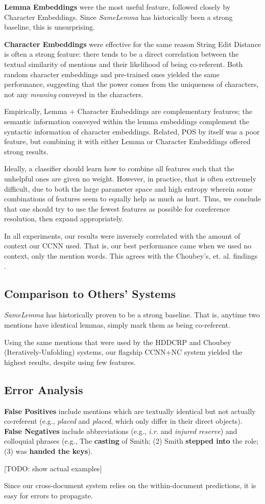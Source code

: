 \textbf{Lemma Embeddings} were the most useful feature, followed closely by Character Embeddings.  Since \textit{SameLemma} has historically been a strong baseline, this is unsurprising.  

\textbf{Character Embeddings} were effective for the same reason String Edit Distance is often a strong feature: there tends to be a direct correlation between the textual similarity of mentions and their likelihood of being co-referent. Both random character embeddings and pre-trained ones yielded the same performance, suggesting that the power comes from the uniqueness of characters, not any \textit{meaning} conveyed in the characters.

Empirically, Lemma + Character Embeddings are complementary features; the semantic information conveyed within the lemma embeddings complement the syntactic information of character embeddings.  Related, POS by itself was a poor feature, but combining it with either Lemma or Character Embeddings offered strong results. 

Ideally, a classifier should learn how to combine all features such that the unhelpful ones are given no weight.  However, in practice, that is often extremely difficult, due to both the large parameter space and high entropy wherein some combinations of features seem to equally help as much as hurt.  Thus, we conclude that one should try to use the fewest features as possible for coreference resolution, then expand appropriately.

In all experiments, our results were inversely correlated with the amount of context our CCNN used.  That is, our best performance came when we used no context, only the mention words.  This agrees with the Choubey's, et. al. findings \cite{Choubey2017EventCR}.

\subsection{Comparison to Others' Systems}
\textit{SameLemma} has historically proven to be a strong baseline.  That is, anytime two mentions have identical lemmas, simply mark them as being co-referent.

Using the same mentions that were used by the HDDCRP and Choubey (Iteratively-Unfolding) systems, our flagship CCNN+NC system yielded the highest results, despite using few features.


\subsection{Error Analysis}
\textbf{False Positives} include mentions which are textually identical but not actually co-referent (e.g., \textit{placed} and \textit{placed}, which only differ in their direct objects).
\textbf{False Negatives} include abbreviations (e.g., \textit{i.r.} and \textit{injured reserve}) and colloquial phrases (e.g., The \textbf{casting} of Smith; (2) Smith \textbf{stepped into} the role; (3) was \textbf{handed the keys}).

[TODO: show actual examples]

Since our cross-document system relies on the within-document predictions, it is easy for errors to propagate.